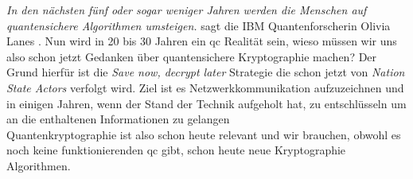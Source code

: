 \textit{\glqq In den nächsten fünf oder sogar weniger Jahren werden die Menschen auf quantensichere Algorithmen umsteigen.\grqq{}} sagt die IBM Quantenforscherin Olivia Lanes \cite[15:02 min]{cleo_abram_quantum_2023}. Nun wird in 20 bis 30 Jahren ein \ac{qc} Realität sein, wieso müssen wir uns also schon jetzt Gedanken über quantensichere Kryptographie machen?
Der Grund hierfür ist die \textit{\glqq Save now, decrypt later\grqq{}} Strategie die schon jetzt von \textit{Nation State Actors} verfolgt wird. Ziel ist es Netzwerkkommunikation aufzuzeichnen und in einigen Jahren, wenn der Stand der Technik aufgeholt hat, zu entschlüsseln um an die enthaltenen Informationen zu gelangen \cite{townsend_solving_2022}\\
Quantenkryptographie ist also schon heute relevant und wir brauchen, obwohl es noch keine funktionierenden \ac{qc} gibt, schon heute neue Kryptographie Algorithmen.
